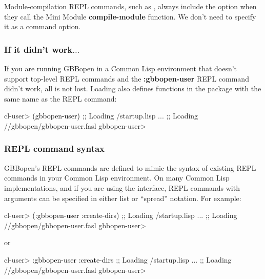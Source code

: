 \documentclass[10pt,twoside,english,pdftex]{article}
\begin{document}
Module-compilation REPL commands, such as ,
always include the  option when they call the Mini Module
\textbf{compile-module} function.  We don't need to specify it as a command
option.

\subsubsection*{If it didn't work$\ldots$}

If you are running GBBopen in a Common Lisp environment that doesn't support
top-level REPL commands and the \textbf{:gbbopen-user} REPL command didn't
work, all is not lost.  Loading 
also defines functions in the  package with the same
name as the REPL command:
%
\W\supp
\begin{example}
\textcolor{darkergray}{%
  cl-user> \textcolor{black}{(gbbopen-user)}
  ;; Loading /startup.lisp
     ...
  ;; Loading //gbbopen/gbbopen-user.fasl
  gbbopen-user>}
\end{example}

\subsubsection*{REPL command syntax}
\label{sec:REPL-command-syntax}

GBBopen's REPL commands are defined to mimic the syntax of existing REPL
commands in your Common Lisp environment.  On many Common Lisp
implementations, and if you are using the
 interface, REPL
commands with arguments can be specified in either list or ``spread''
notation.  For example:
%
\W\supp
\begin{example}
\textcolor{darkergray}{%
  cl-user> \textcolor{black}{(:gbbopen-user :create-dirs)}
  ;; Loading /startup.lisp
     ...
  ;; Loading //gbbopen/gbbopen-user.fasl
  gbbopen-user>}
\end{example}
%
or
%
\W\supp\notpretop
\begin{example}
\textcolor{darkergray}{%
  cl-user> \textcolor{black}{:gbbopen-user :create-dirs}
  ;; Loading /startup.lisp
     ...
  ;; Loading //gbbopen/gbbopen-user.fasl
  gbbopen-user>}
\end{example}
\end{document}
